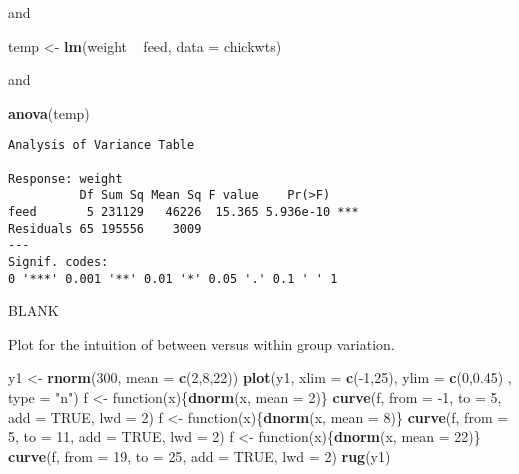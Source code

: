 \documentclass[]{book}
\newenvironment{Shaded}{\begin{snugshade}}{\end{snugshade}}
\newcommand{\KeywordTok}[1]{\textcolor[rgb]{0.13,0.29,0.53}{\textbf{{#1}}}}
\newcommand{\DataTypeTok}[1]{\textcolor[rgb]{0.13,0.29,0.53}{{#1}}}
\newcommand{\DecValTok}[1]{\textcolor[rgb]{0.00,0.00,0.81}{{#1}}}
\newcommand{\FloatTok}[1]{\textcolor[rgb]{0.00,0.00,0.81}{{#1}}}
\newcommand{\StringTok}[1]{\textcolor[rgb]{0.31,0.60,0.02}{{#1}}}
\newcommand{\OtherTok}[1]{\textcolor[rgb]{0.56,0.35,0.01}{{#1}}}
\newcommand{\NormalTok}[1]{{#1}}
\numberwithin{equation}{chapter}
\numberwithin{figure}{chapter}
\theoremstyle{plain}
\theoremstyle{definition}
\theoremstyle{remark}
\theoremstyle{definition}
\theoremstyle{definition}
\theoremstyle{remark}
\begin{document}
and

\begin{Shaded}
\begin{Highlighting}[]
\NormalTok{temp <-}\StringTok{ }\KeywordTok{lm}\NormalTok{(weight ~}\StringTok{ }\NormalTok{feed, }\DataTypeTok{data =} \NormalTok{chickwts)}
\end{Highlighting}
\end{Shaded}

and

\begin{Shaded}
\begin{Highlighting}[]
\KeywordTok{anova}\NormalTok{(temp)}
\end{Highlighting}
\end{Shaded}

\begin{verbatim}
Analysis of Variance Table

Response: weight
          Df Sum Sq Mean Sq F value    Pr(>F)    
feed       5 231129   46226  15.365 5.936e-10 ***
Residuals 65 195556    3009                      
---
Signif. codes:  
0 '***' 0.001 '**' 0.01 '*' 0.05 '.' 0.1 ' ' 1
\end{verbatim}

BLANK

Plot for the intuition of between versus within group variation.

\begin{Shaded}
\begin{Highlighting}[]
\NormalTok{y1 <-}\StringTok{ }\KeywordTok{rnorm}\NormalTok{(}\DecValTok{300}\NormalTok{, }\DataTypeTok{mean =} \KeywordTok{c}\NormalTok{(}\DecValTok{2}\NormalTok{,}\DecValTok{8}\NormalTok{,}\DecValTok{22}\NormalTok{))}
\KeywordTok{plot}\NormalTok{(y1, }\DataTypeTok{xlim =} \KeywordTok{c}\NormalTok{(-}\DecValTok{1}\NormalTok{,}\DecValTok{25}\NormalTok{), }\DataTypeTok{ylim =} \KeywordTok{c}\NormalTok{(}\DecValTok{0}\NormalTok{,}\FloatTok{0.45}\NormalTok{) , }\DataTypeTok{type =} \StringTok{"n"}\NormalTok{)}
\NormalTok{f <-}\StringTok{ }\NormalTok{function(x)\{}\KeywordTok{dnorm}\NormalTok{(x, }\DataTypeTok{mean =} \DecValTok{2}\NormalTok{)\}}
\KeywordTok{curve}\NormalTok{(f, }\DataTypeTok{from =} \NormalTok{-}\DecValTok{1}\NormalTok{, }\DataTypeTok{to =} \DecValTok{5}\NormalTok{, }\DataTypeTok{add =} \OtherTok{TRUE}\NormalTok{, }\DataTypeTok{lwd =} \DecValTok{2}\NormalTok{)}
\NormalTok{f <-}\StringTok{ }\NormalTok{function(x)\{}\KeywordTok{dnorm}\NormalTok{(x, }\DataTypeTok{mean =} \DecValTok{8}\NormalTok{)\}}
\KeywordTok{curve}\NormalTok{(f, }\DataTypeTok{from =} \DecValTok{5}\NormalTok{, }\DataTypeTok{to =} \DecValTok{11}\NormalTok{, }\DataTypeTok{add =} \OtherTok{TRUE}\NormalTok{, }\DataTypeTok{lwd =} \DecValTok{2}\NormalTok{)}
\NormalTok{f <-}\StringTok{ }\NormalTok{function(x)\{}\KeywordTok{dnorm}\NormalTok{(x, }\DataTypeTok{mean =} \DecValTok{22}\NormalTok{)\}}
\KeywordTok{curve}\NormalTok{(f, }\DataTypeTok{from =} \DecValTok{19}\NormalTok{, }\DataTypeTok{to =} \DecValTok{25}\NormalTok{, }\DataTypeTok{add =} \OtherTok{TRUE}\NormalTok{, }\DataTypeTok{lwd =} \DecValTok{2}\NormalTok{)}
\KeywordTok{rug}\NormalTok{(y1)}
\end{Highlighting}
\end{Shaded}
\end{document}
